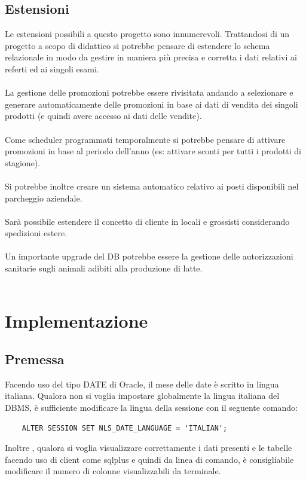\documentclass[12pt]{report}
\begin{document}
\newpage

\section{Estensioni}
Le estensioni possibili a questo progetto sono innumerevoli. Trattandosi di un progetto a scopo di didattico si potrebbe pensare di estendere lo schema relazionale in modo da gestire in maniera più precisa e corretta i dati relativi ai referti ed ai singoli esami.\\\\
La gestione delle promozioni potrebbe essere rivisitata andando a selezionare e generare automaticamente delle promozioni in base ai dati di vendita dei singoli prodotti (e quindi avere accesso ai dati delle vendite).\\\\
Come scheduler programmati temporalmente si potrebbe pensare di attivare promozioni in base al periodo dell'anno (es: attivare sconti per tutti i prodotti di stagione).\\\\
Si potrebbe inoltre creare un sistema automatico relativo ai posti disponibili nel parcheggio aziendale.\\\\
Sarà possibile estendere il concetto di cliente in locali e grossisti considerando spedizioni estere.\\\\
Un importante upgrade del DB potrebbe essere la gestione delle autorizzazioni sanitarie sugli animali adibiti alla produzione di latte.\\\\
\chapter{Implementazione}
\section*{Premessa}
Facendo uso del tipo DATE di Oracle, il mese delle date è scritto in lingua italiana. Qualora non si voglia impostare globalmente la lingua italiana del DBMS, è sufficiente modificare la lingua della sessione con il seguente comando:

\begin{lstlisting}
	ALTER SESSION SET NLS_DATE_LANGUAGE = 'ITALIAN';
\end{lstlisting}
Inoltre , qualora si voglia visualizzare correttamente i dati presenti e le tabelle facendo uso di client come sqlplus e quindi da linea di comando, è consigliabile modificare il numero di colonne visualizzabili da terminale.
\end{document}
